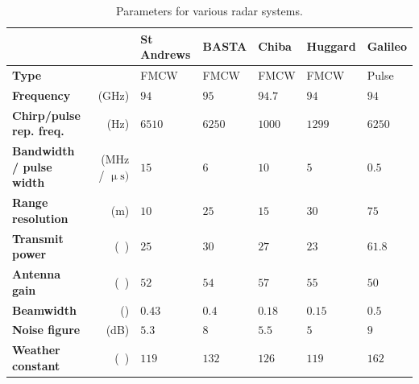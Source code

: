 \documentclass{article}
\begin{document}
\begin{table}
	\begin{tabular}{lr|l|l|l|l|l}
		& & St Andrews\supercite{StAndrewsRadar} & BASTA\supercite{BASTA} & Chiba\supercite{Chiba} & Huggard\supercite{HuggardRadar} & Galileo\supercite{Galileo} \\
		\midrule
		\textbf{Type}                    &                                            & FMCW     & FMCW     & FMCW     & FMCW     & Pulse    \\
		\textbf{Frequency}               & (\si{\giga\hertz})                         & \(94\)   & \(95\)   & \(94.7\) & \(94\)   & \(94\)   \\
		\textbf{Chirp/pulse rep. freq.}  & (\si{\hertz})                              & \(6510\) & \(6250\) & \(1000\) & \(1299\) & \(6250\) \\
		\textbf{Bandwidth / pulse width} & (\si{\mega\hertz} / \(\upmu\si{\second})\) & \(15\)   & \(6\)    & \(10\)   & \(5\)    & \(0.5\)  \\
		\textbf{Range resolution}        & (\si{\metre})                              & \(10\)   & \(25\)   & \(15\)   & \(30\)   & \(75\)   \\
		
		\textbf{Transmit power}          & (\si{\deci\belm})                          & \(25\)   & \(30\)   & \(27\)   & \(23\)   & \(61.8\) \\
		\textbf{Antenna gain}            & (\si{\deci\beli})                          & \(52\)   & \(54\)   & \(57\)   & \(55\)   & \(50\)   \\
		\textbf{Beamwidth}               & (\degree)                                  & \(0.43\) & \(0.4\)  & \(0.18\) & \(0.15\) & \(0.5\)  \\
		
		\textbf{Noise figure}            & (\si{\deci\bel})                           & \(5.3\)  & \(8\)    & \(5.5\)  & \(5\)    & \(9\)    \\
		
		\textbf{Weather constant}        & (\si{\deci\belm})                          & \(119\)  & \(132\)  & \(126\)  & \(119\)  & \(162\)  \\
	\end{tabular}
	\caption{Parameters for various radar systems.}
	\label{tbl:RadarSystems}
\end{table}
\end{document}
